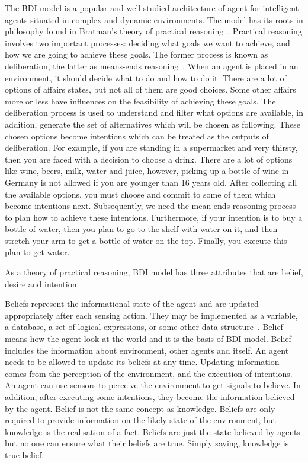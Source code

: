 The BDI model is a popular and well-studied architecture of agent for intelligent agents situated in complex and dynamic environments.
The model has its roots in philosophy found in Bratman's theory of practical reasoning~\cite{Sebastian_Hierarchical_2006}.
Practical reasoning involves two important processes: deciding what goals we want to achieve, and how we are going to achieve these goals.
The former process is known as deliberation, the latter as means-ends reasoning~\cite{Gerhard_MultiSystem_1999}.
When an agent is placed in an environment, it should decide what to do and how to do it.
There are a lot of options of affairs states, but not all of them are good choices.
Some other affairs more or less have influences on the feasibility of achieving these goals.
The deliberation process is used to understand and filter what options are available, in addition, generate the set of alternatives which will be chosen as following.
These chosen options become intentions which can be treated as the outputs of deliberation.
For example, if you are standing in a supermarket and very thirsty, then you are faced with a decision to choose a drink.
There are a lot of options like wine, beers, milk, water and juice, however, picking up a bottle of wine in Germany is not allowed if you are younger than 16 years old. %
After collecting all the available options, you must choose and commit to some of them which become intentions next.
Subsequently, we need the mean-ends reasoning process to plan how to achieve these intentions.
Furthermore, if your intention is to buy a bottle of water, then you plan to go to the shelf with water on it, and then stretch your arm to get a bottle of water on the top.
Finally, you execute this plan to get water.

As a theory of practical reasoning, BDI model has three attributes that are belief, desire and intention.

Beliefs represent the informational state of the agent and are updated appropriately after each sensing action.
They may be implemented as a variable, a database, a set of logical expressions, or some other data structure~\cite{Rao_BDITheory_1995}.
Belief means how the agent look at the world and it is the basis of BDI model.
Belief includes the information about environment, other agents and itself.
An agent needs to be allowed to update its beliefs at any time.
Updating information comes from the perception of the environment, and the execution of intentions.
An agent can use sensors to perceive the environment to get signals to believe.
In addition, after executing some intentions, they become the information believed by the agent.
Belief is not the same concept as knowledge.
Beliefs are only required to provide information on the likely state of the environment, but knowledge is the realisation of a fact.
Beliefs are just the state believed by agents but no one can ensure what their beliefs are true.
Simply saying, knowledge is true belief.

